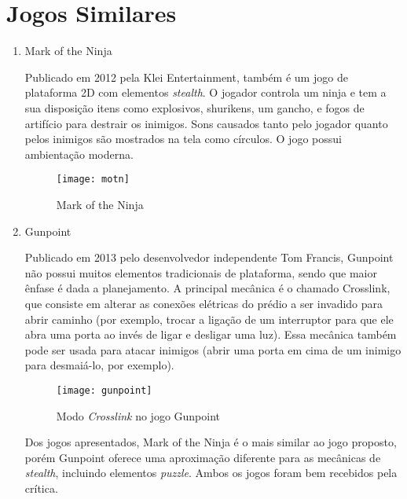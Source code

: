 \AddToShipoutPicture{\BackgroundPic}

\section*{Jogos Similares}

\begin{enumerate}
	\item {\Large Mark of the Ninja}
	
	Publicado em 2012 pela Klei Entertainment, também é um jogo de plataforma 2D com elementos \emph{stealth}. O jogador controla um ninja e tem a sua disposição itens como explosivos, shurikens, um gancho, e fogos de artifício para destrair os inimigos. Sons causados tanto pelo jogador quanto pelos inimigos são mostrados na tela como círculos. O jogo possui ambientação moderna. 

	\begin{figure}[htb]
		\centering
		\texttt{[image: motn]}
		\caption{Mark of the Ninja}
	\end{figure}

	\item {\Large Gunpoint}
	
	Publicado em 2013 pelo desenvolvedor independente Tom Francis, Gunpoint não possui muitos elementos tradicionais de plataforma, sendo que maior ênfase é dada a planejamento. A principal mecânica é o chamado Crosslink, que consiste em alterar as conexões elétricas do prédio a ser invadido para abrir caminho (por exemplo, trocar a ligação de um interruptor para que ele abra uma porta ao invés de ligar e desligar uma luz). Essa mecânica também pode ser usada para atacar inimigos (abrir uma porta em cima de um inimigo para desmaiá-lo, por exemplo).

	\begin{figure}[h]
		\centering
		\texttt{[image: gunpoint]}
		\caption{Modo \emph{Crosslink} no jogo Gunpoint}
	\end{figure}

	Dos jogos apresentados, Mark of the Ninja é o mais similar ao jogo proposto, porém Gunpoint oferece uma aproximação diferente para as mecânicas de \emph{stealth}, incluindo elementos \emph{puzzle}. Ambos os jogos foram bem recebidos pela crítica.
	
\end{enumerate}
